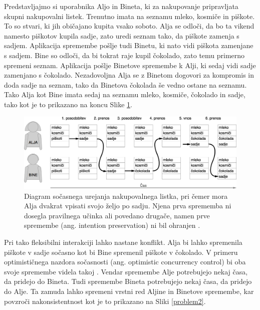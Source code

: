 \documentclass[a4paper, 12pt, twoside]{book}
\begin{document}
Predstavljajmo si uporabnika Aljo in Bineta, ki za nakupovanje pripravljata skupni nakupovalni listek. Trenutno imata na seznamu mleko, kosmiče in piškote. To so stvari, ki jih običajano kupita vsako soboto. Alja se odloči, da bo ta vikend namesto piškotov kupila sadje, zato uredi seznam tako, da piškote zamenja s sadjem. Aplikacija spremembe pošlje tudi Binetu, ki nato vidi piškota zamenjane s sadjem. Bine so odloči, da bi tokrat raje kupil čokolado, zato temu primerno spremeni seznam. Aplikacija pošlje Binetove spremembe k Alji, ki sedaj vidi sadje zamenjano s čokolado. Nezadovoljna Alja se z Binetom dogovori za kompromis in doda sadje na seznam, tako da Binetova čokolada še vedno ostane na seznamu. Tako Alja kot Bine imata sedaj na seznamu mleko, kosmiče, čokolado in sadje, tako kot je to prikazano na koncu Slike \ref{problem1}.

\pagebreak

\begin{figure}[placement h]
\begin{center}
\includegraphics[width=16cm]{problem1.png}
\end{center}
\caption{Diagram sočasnega urejanja nakupovalnega listka, pri čemer mora Alja dvakrat vpisati svojo željo po sadju. Njena prva sprememba ni dosegla pravilnega učinka ali povedano drugače, namen prve spremembe (ang. intention preservation) ni bil ohranjen \cite{sigce}.}
\label{problem1}
\end{figure}

Pri tako fleksibilni interakciji lahko nastane konflikt. Alja bi lahko spremenila piškote v sadje sočasno kot bi Bine spremenil piškote v čokolado. V primeru optimističnega nazdora sočasnosti (ang. optimistic concurrency control) bi oba svoje spremembe videla takoj \cite{hllbw}. Vendar spremembe Alje potrebujejo nekaj časa, da pridejo do Bineta. Tudi spremembe Bineta potrebujejo nekaj časa, da pridejo do Alje. Ta zamuda lahko spremeni vrstni red Aljine in Binetove spremembe, kar povzroči nakonsistentnost kot je to prikazano na Sliki \ref{problem2}.
\end{document}
